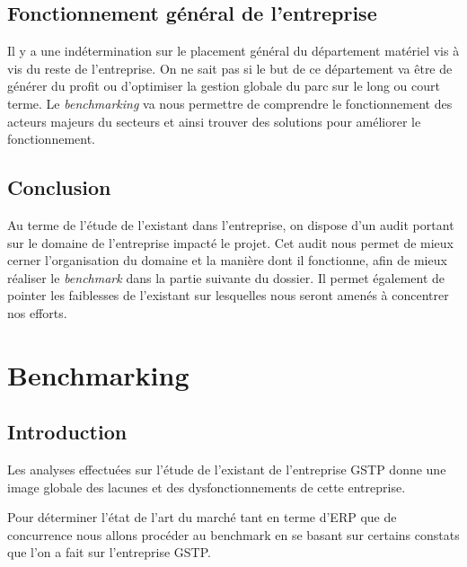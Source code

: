 \documentclass[twoside]{article}
\begin{document}
\subsection{Fonctionnement général de l'entreprise}

Il y a une indétermination sur le placement général du département matériel 
vis à vis du reste de l'entreprise. On ne sait pas si le but de ce département
va être de générer du profit ou d'optimiser la gestion globale du parc sur le long
ou court terme. Le {\sl benchmarking} va nous permettre de comprendre le 
fonctionnement des acteurs majeurs du secteurs et ainsi trouver des solutions
pour améliorer le fonctionnement.

\subsection{Conclusion}

Au terme de l'étude de l'existant dans l'entreprise, on dispose d'un audit
portant sur le domaine de l'entreprise impacté le projet. Cet audit nous
permet de mieux cerner l'organisation du domaine et la manière dont il
fonctionne, afin de mieux réaliser le {\sl benchmark} dans la partie
suivante du dossier. Il permet également de pointer les faiblesses de
l'existant sur lesquelles nous seront amenés à concentrer nos efforts.


\vfil
\pagebreak
\section{Benchmarking}

\subsection{Introduction}

Les analyses effectuées sur l'étude de l'existant
de l'entreprise GSTP donne une
image globale des lacunes et des dysfonctionnements
de cette entreprise.

Pour déterminer l'état de l'art du marché tant en
terme d'ERP que de concurrence
nous allons procéder au benchmark en se basant sur
certains constats que l'on
a fait sur l'entreprise GSTP.
\end{document}
